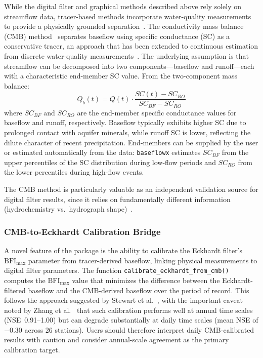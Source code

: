 \documentclass[hydrology,article,submit,pdftex,moreauthors]{Definitions/mdpi}
\begin{document}
While the digital filter and graphical methods described above rely solely on streamflow data, tracer-based methods incorporate water-quality measurements to provide a physically grounded separation~\cite{Klaus2013}. The conductivity mass balance (CMB) method~\cite{Stewart2007} separates baseflow using specific conductance (SC) as a conservative tracer, an approach that has been extended to continuous estimation from discrete water-quality measurements~\cite{Miller2015}. The underlying assumption is that streamflow can be decomposed into two components---baseflow and runoff---each with a characteristic end-member SC value. From the two-component mass balance:
\begin{equation}
\label{eq:cmb}
Q_b(t) = Q(t) \cdot \frac{SC(t) - SC_{RO}}{SC_{BF} - SC_{RO}}
\end{equation}
where $SC_{BF}$ and $SC_{RO}$ are the end-member specific conductance values for baseflow and runoff, respectively. Baseflow typically exhibits higher SC due to prolonged contact with aquifer minerals, while runoff SC is lower, reflecting the dilute character of recent precipitation. End-members can be supplied by the user or estimated automatically from the data: \texttt{baseflowx} estimates $SC_{BF}$ from the upper percentiles of the SC distribution during low-flow periods and $SC_{RO}$ from the lower percentiles during high-flow events.

The CMB method is particularly valuable as an independent validation source for digital filter results, since it relies on fundamentally different information (hydrochemistry vs.\ hydrograph shape)~\cite{Lott2016}.

\subsubsection{CMB-to-Eckhardt Calibration Bridge}

A novel feature of the package is the ability to calibrate the Eckhardt filter's $\mathrm{BFI_{max}}$ parameter from tracer-derived baseflow, linking physical measurements to digital filter parameters. The function \texttt{calibrate\_eckhardt\_from\_cmb()} computes the $\mathrm{BFI_{max}}$ value that minimizes the difference between the Eckhardt-filtered baseflow and the CMB-derived baseflow over the period of record. This follows the approach suggested by Stewart et al.~\cite{Stewart2007}, with the important caveat noted by Zhang et al.~\cite{Zhang2021} that such calibration performs well at annual time scales (NSE~0.91--1.00) but can degrade substantially at daily time scales (mean NSE of $-0.30$ across 26 stations). Users should therefore interpret daily CMB-calibrated results with caution and consider annual-scale agreement as the primary calibration target.
\end{document}
